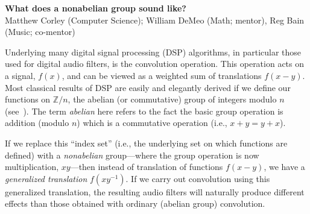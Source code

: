 \documentclass[10pt]{article}
\begin{document}
\begin{center}
{\bf What does a nonabelian group sound like?}\\
Matthew Corley (Computer Science); William DeMeo (Math; mentor), Reg
Bain (Music; co-mentor)
\end{center}

Underlying many digital signal processing (DSP) algorithms, in particular those
used for digital audio filters, is the convolution operation.  This operation
acts on a signal, $f(x)$, and can be viewed as a weighted sum of translations
$f(x-y)$. Most classical results of DSP are easily and elegantly derived if we
define our functions on $\mathbb{Z}/n$, the abelian (or commutative) group of
integers modulo $n$ (see~\cite{Tolimieri:1998}).
  The term \emph{abelian} here refers to the fact the basic
group operation is addition (modulo $n$) which is a commutative operation (i.e.,
$x+y = y+x$).

If we replace this ``index set'' (i.e., the underlying set on which functions
are defined) with a \emph{nonabelian} group---where the
group operation is now multiplication, $xy$---then instead of translation of
functions $f(x-y)$, we have a \emph{generalized translation} $f(xy^{-1})$.  If
we carry out convolution using this generalized translation, the resulting audio
filters will naturally produce different effects than those obtained with
ordinary (abelian group) convolution.  
\end{document}
